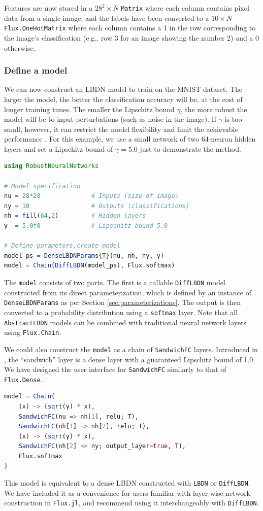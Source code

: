 Features are now stored in a $28^2\times N$ \verb|Matrix| where each column contains pixel data from a single image, and the labels have been converted to a $10\times N$ \verb|Flux.OneHotMatrix| where each column contains a 1 in the row corresponding to the image's classification (e.g., row 3 for an image showing the number 2) and a 0 otherwise.

\subsubsection{Define a model} \label{sec:mnist-model}

We can now construct an LBDN model to train on the MNIST dataset. The larger the model, the better the classification accuracy will be, at the cost of longer training times. The smaller the Lipschitz bound $\gamma$, the more robust the model will be to input perturbations (such as noise in the image). If $\gamma$ is too small, however, it can restrict the model flexibility and limit the achievable performance \cite{Wang+Manchester2023}. For this example, we use a small network of two 64-neuron hidden layers and set a Lipschitz bound of $\gamma=5.0$ just to demonstrate the method.

\begin{lstlisting}[language = Julia]
using RobustNeuralNetworks

# Model specification
nu = 28*28              # Inputs (size of image)
ny = 10                 # Outputs (classifications)
nh = fill(64,2)         # Hidden layers 
γ  = 5.0f0              # Lipschitz bound 5.0

# Define parameters,create model
model_ps = DenseLBDNParams{T}(nu, nh, ny, γ)
model = Chain(DiffLBDN(model_ps), Flux.softmax)
\end{lstlisting}

The \verb|model| consists of two parts. The first is a callable \verb|DiffLBDN| model constructed from its direct parameterization, which is defined by an instance of \verb|DenseLBDNParams| as per Section \ref{sec:parameterizations}. The output is then converted to a probability distribution using a \verb|softmax| layer. Note that all \verb|AbstractLBDN| models can be combined with traditional neural network layers using \verb|Flux.Chain|. 

We could also construct the \verb|model| as a chain of \verb|SandwichFC| layers. Introduced in \cite{Wang+Manchester2023}, the ``sandwich'' layer is a dense layer with a guaranteed Lipschitz bound of 1.0. We have designed the user interface for \verb|SandwichFC| similarly to that of \verb|Flux.Dense|.
\begin{lstlisting}[language = Julia]
model = Chain(
    (x) -> (sqrt(γ) * x),
    SandwichFC(nu => nh[1], relu; T),
    SandwichFC(nh[1] => nh[2], relu; T),
    (x) -> (sqrt(γ) * x),
    SandwichFC(nh[2] => ny; output_layer=true, T),
    Flux.softmax
)
\end{lstlisting}
This model is equivalent to a dense LBDN constructed with \verb|LBDN| or \verb|DiffLBDN|. We have included it as a convenience for users familiar with layer-wise network construction in \verb|Flux.jl|, and recommend using it interchangeably with \verb|DiffLBDN|.

